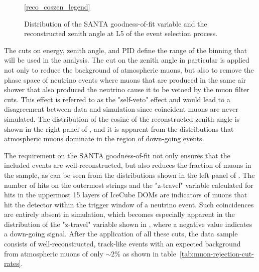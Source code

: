\begin{figure}
    \centering
    \ref{reco_coszen_legend}\par
    
    
    \caption{Distribution of the SANTA goodness-of-fit variable and the reconstructed zenith angle at L5 of the event selection process.}
    \label{fig:final_cut_vars_l5}
\end{figure}

The cuts on energy, zenith angle, and PID define the range of the binning that will be used in the analysis. The cut on the zenith angle in particular is applied not only to reduce the background of atmospheric muons, but also to remove the phase space of neutrino events where muons that are produced in the same air shower that also produced the neutrino cause it to be vetoed by the muon filter cuts. This effect is referred to as the "self-veto" effect and would lead to a disagreement between data and simulation since coincident muons are never simulated. The distribution of the cosine of the reconstructed zenith angle is shown in the right panel of , and it is apparent from the distributions that atmospheric muons dominate in the region of down-going events.

The requirement on the SANTA goodness-of-fit not only ensures that the included events are well-reconstructed, but also reduces the fraction of muons in the sample, as can be seen from the distributions shown in the left panel of . The number of hits on the outermost strings and the "z-travel" variable calculated for hits in the uppermost 15 layers of IceCube DOMs are indicators of muons that hit the detector within the trigger window of a neutrino event. Such coincidences are entirely absent in simulation, which becomes especially apparent in the distribution of the "z-travel" variable shown in , where a negative value indicates a down-going signal. After the application of all these cuts, the data sample consists of well-reconstructed, track-like events with an expected background from atmospheric muons of only $\sim 2\%$ as shown in table~\ref{tab:muon-rejection-cut-rates}.

